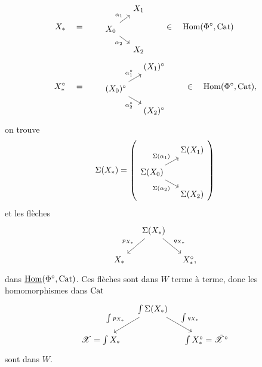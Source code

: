 \[
\begin{aligned}
X_* \quad &= \qquad
\begin{tikzcd}[ampersand replacement=\&, row sep=small, column sep=small]
 \& X_1 \\
X_0 \arrow[ur, "\alpha_1"] \arrow[dr, "\alpha_2"'] \& \\
 \& X_2
\end{tikzcd}
\qquad \in \quad \Hom(\Phi^\circ,\Cat)\\
X_*^\circ \quad &= \qquad
\begin{tikzcd}[ampersand replacement=\&, row sep=small, column sep=small]
 \& (X_1)^\circ \\
(X_0)^\circ \arrow[ur, "\alpha_1^\circ"] \arrow[dr, "\alpha_2^\circ"'] \& \\
 \& (X_2)^\circ
\end{tikzcd}
\qquad \in \quad \Hom(\Phi^\circ,\Cat),
\end{aligned}
\]
on trouve
\[
\Sigma(X_*) =
\left(
\begin{tikzcd}[row sep=small, column sep=small]
 & \Sigma(X_1) \\
\Sigma(X_0) \arrow[ur, "\Sigma(\alpha_1)"] \arrow[dr, "\Sigma(\alpha_2)"'] & \\
 & \Sigma(X_2)
\end{tikzcd}
\right)
\]
et les flèches
\[
\begin{tikzcd}[column sep=small]
 & \Sigma(X_*) \arrow[dl, "p_{X_*}"'] \arrow[dr, "q_{X_*}"] & \\
X_* & & X_*^\circ,
\end{tikzcd}
\]
dans $\underline{\mathrm{Hom}}(\Phi^\circ,\mathrm{Cat})$. Ces flèches sont dans $W$ terme à terme, donc les homomorphismes dans $\mathrm{Cat}$
\[
\begin{tikzcd}[column sep=small]
 & \int\Sigma(X_*) \arrow[dl, "\int p_{X_*}"'] \arrow[dr, "\int q_{X_*}"] & \\
\sX=\int X_* & & \int X_*^\circ=\tsX^\circ
\end{tikzcd}
\]
sont dans $W$.

